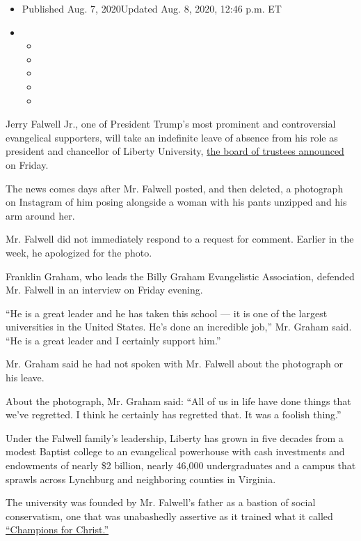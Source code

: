 \begin{itemize}
\item
  Published Aug. 7, 2020Updated Aug. 8, 2020, 12:46 p.m. ET
\item
  \begin{itemize}
  \item
  \item
  \item
  \item
  \item
  \end{itemize}
\end{itemize}

Jerry Falwell Jr., one of President Trump's most prominent and
controversial evangelical supporters, will take an indefinite leave of
absence from his role as president and chancellor of Liberty University,
\href{http://www.liberty.edu/news/index.cfm?PID=18495\&MID=380385}{the
board of trustees announced} on Friday.

The news comes days after Mr. Falwell posted, and then deleted, a
photograph on Instagram of him posing alongside a woman with his pants
unzipped and his arm around her.

Mr. Falwell did not immediately respond to a request for comment.
Earlier in the week, he apologized for the photo.

Franklin Graham, who leads the Billy Graham Evangelistic Association,
defended Mr. Falwell in an interview on Friday evening.

``He is a great leader and he has taken this school --- it is one of the
largest universities in the United States. He's done an incredible
job,'' Mr. Graham said. ``He is a great leader and I certainly support
him.''

Mr. Graham said he had not spoken with Mr. Falwell about the photograph
or his leave.

About the photograph, Mr. Graham said: ``All of us in life have done
things that we've regretted. I think he certainly has regretted that. It
was a foolish thing.''

Under the Falwell family's leadership, Liberty has grown in five decades
from a modest Baptist college to an evangelical powerhouse with cash
investments and endowments of nearly \$2 billion, nearly 46,000
undergraduates and a campus that sprawls across Lynchburg and
neighboring counties in Virginia.

The university was founded by Mr. Falwell's father as a bastion of
social conservatism, one that was unabashedly assertive as it trained
what it called
\href{https://www.liberty.edu/aboutliberty/index.cfm?PID=6925}{``Champions
for Christ.''}

